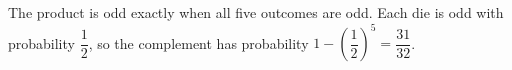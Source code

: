 The product is odd exactly when all five outcomes are odd. Each die is odd with probability $\dfrac{1}{2}$, so the complement has probability $1-\left(\dfrac{1}{2}\right)^5=\boxed{\dfrac{31}{32}}$.
